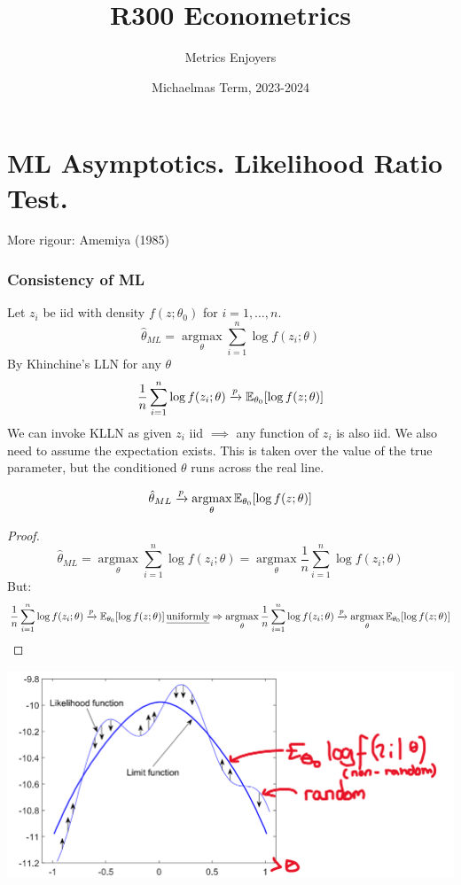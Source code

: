 \documentclass[DIV=14,titlepage=false]{scrreprt}
\title{%
R300 Econometrics}
\author{Metrics Enjoyers}
\date{Michaelmas Term, 2023-2024}
\begin{document}
\chapter{ML Asymptotics. Likelihood Ratio Test.}

More rigour: Amemiya (1985)

\subsection{Consistency of ML}

Let \(z_i\) be iid with density \(f(z;\theta_0)\) for \(i=1,\dots,n\).
\[\hat{\theta}_{ML}=\operatorname*{argmax}_{\theta}\sum_{i=1}^n\log f(z_i;\theta)\]
By Khinchine's LLN for any \(\theta\)
\[\frac{1}{n}\sum_{i=1}^n\log f(z_i;\theta)\xrightarrow{p}\mathbb{E}_{\theta_0}[\log f(z;\theta)]\]
We can invoke KLLN as given \(z_i\) iid \(\implies\) any function of \(z_i\) is also iid. We also need to assume the expectation exists. This is taken over the value of the true parameter, but the conditioned \(\theta\) runs across the real line.
\vspace{5mm}
\begin{prop}
\[\hat{\theta}_{ML}\xrightarrow{p}\operatorname*{argmax}_{\theta}\mathbb{E}_{\theta_0}[\log f(z;\theta)]\]
\end{prop}
\vspace{5mm}
\begin{proof}
\[\hat{\theta}_{ML}=\operatorname*{argmax}_{\theta}\sum_{i=1}^n\log f(z_i;\theta)=\operatorname*{argmax}_{\theta}\frac{1}{n}\sum_{i=1}^n\log f(z_i;\theta)\]
But:
\[\frac{1}{n}\sum_{i=1}^n\log f(z_i;\theta)\xrightarrow{p}\mathbb{E}_{\theta_0}[\log f(z;\theta)] \,\text{\underline{uniformly}} \Rightarrow \operatorname*{argmax}_{\theta}\frac{1}{n}\sum_{i=1}^n\log f(z_i;\theta)\xrightarrow{p}\operatorname*{argmax}_{\theta}\mathbb{E}_{\theta_0}[\log f(z;\theta)] \]
\end{proof}
\begin{center}
\includegraphics[width=\textwidth]{./Images/ML Asymptotics.png}
\end{center}
\end{document}
